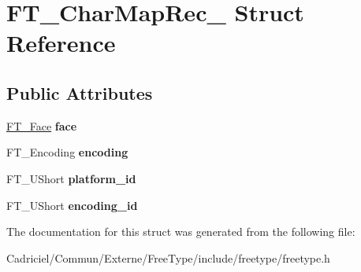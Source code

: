 \hypertarget{struct_f_t___char_map_rec__}{\section{F\-T\-\_\-\-Char\-Map\-Rec\-\_\- Struct Reference}
\label{struct_f_t___char_map_rec__}
}
\subsection*{Public Attributes}
\begin{DoxyCompactItemize}
\item 
\hypertarget{struct_f_t___char_map_rec___a70a4e53e3f9818209916e5745c46dc28}{\hyperlink{struct_f_t___face_rec__}{F\-T\-\_\-\-Face} {\bfseries face}}\label{struct_f_t___char_map_rec___a70a4e53e3f9818209916e5745c46dc28}

\item 
\hypertarget{struct_f_t___char_map_rec___a88ee6f726ef11a8e6cc793d59ff5557e}{F\-T\-\_\-\-Encoding {\bfseries encoding}}\label{struct_f_t___char_map_rec___a88ee6f726ef11a8e6cc793d59ff5557e}

\item 
\hypertarget{struct_f_t___char_map_rec___ae7f439996a8615698e780ce3c4f92457}{F\-T\-\_\-\-U\-Short {\bfseries platform\-\_\-id}}\label{struct_f_t___char_map_rec___ae7f439996a8615698e780ce3c4f92457}

\item 
\hypertarget{struct_f_t___char_map_rec___af10dd43eee8dc93e7d6191c663ae831a}{F\-T\-\_\-\-U\-Short {\bfseries encoding\-\_\-id}}\label{struct_f_t___char_map_rec___af10dd43eee8dc93e7d6191c663ae831a}

\end{DoxyCompactItemize}


The documentation for this struct was generated from the following file\-:\begin{DoxyCompactItemize}
\item 
Cadriciel/\-Commun/\-Externe/\-Free\-Type/include/freetype/freetype.\-h\end{DoxyCompactItemize}

